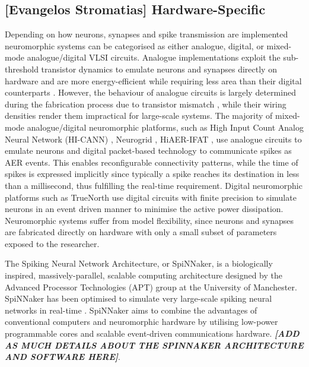 



\subsection{[Evangelos Stromatias] Hardware-Specific}


Depending on how neurons, synapses and spike transmission are implemented neuromorphic systems can be categorised as either analogue, digital, or mixed-mode analogue/digital VLSI circuits. Analogue implementations exploit the sub-threshold transistor dynamics to emulate neurons and synapses directly on hardware \citep{giacom} and are more energy-efficient while requiring less area than their digital counterparts \citep{temamanalogdigital}. However, the behaviour of analogue circuits is largely determined during the fabrication process due to transistor mismatch \citep{giacom,analoguemismatch,bernabeDACsynapses}, while their wiring densities render them impractical for large-scale systems. The majority of mixed-mode analogue/digital neuromorphic platforms, such as High Input Count Analog Neural Network (HI-CANN) \citep{Schemmel_etal10}, Neurogrid \citep{Benjamin_etal14}, HiAER-IFAT \citep{gert}, use analogue circuits to emulate neurons and digital packet-based technology to communicate spikes as AER events. This enables reconfigurable connectivity patterns, while the time of spikes is expressed implicitly since typically a spike reaches its destination in less than a millisecond, thus fulfilling the real-time requirement. Digital neuromorphic platforms such as TrueNorth \citep{Merolla08082014} use digital circuits with finite precision to simulate neurons in an event driven manner to minimise the active power dissipation. Neuromorphic systems suffer from model flexibility, since neurons and synapses are fabricated directly on hardware with only a small subset of parameters exposed to the researcher. 

The Spiking Neural Network Architecture, or SpiNNaker, is a biologically inspired, massively-parallel, scalable computing architecture designed by the Advanced Processor Technologies (APT) group at the University of Manchester. SpiNNaker has been optimised to simulate very large-scale spiking neural networks in real-time \citep{spiNNakerProject}. SpiNNaker aims to combine the advantages of conventional computers and neuromorphic hardware by utilising low-power programmable cores and scalable event-driven communications hardware. \textit{\textbf{[ADD AS MUCH DETAILS ABOUT THE SPINNAKER ARCHITECTURE AND SOFTWARE HERE]}}. 

